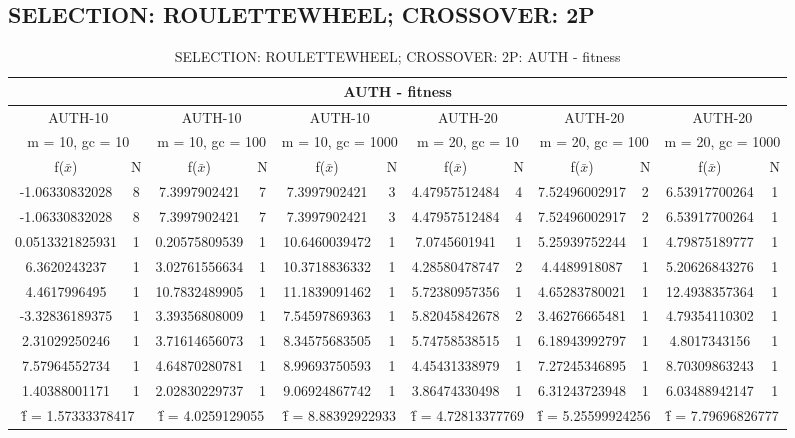 \subsection{SELECTION: ROULETTEWHEEL; CROSSOVER: 2P}
\begin{table}[H]
	\centering
	\caption{SELECTION: ROULETTEWHEEL; CROSSOVER: 2P: AUTH - fitness}
	\begin{adjustbox}{width=1\textwidth}
		\begin{tabular}{ |c|c||c|c||c|c||c|c||c|c||c|c| }
			\hline
			\multicolumn{12}{|c|}{AUTH - fitness} \\
			\hline
			\multicolumn{2}{|c||}{AUTH-10} & \multicolumn{2}{c||}{AUTH-10} & \multicolumn{2}{c||}{AUTH-10} & \multicolumn{2}{c||}{AUTH-20} & \multicolumn{2}{c||}{AUTH-20} & \multicolumn{2}{c|}{AUTH-20}\\
			\hline
			\multicolumn{2}{|c||}{m = 10, gc = 10} & \multicolumn{2}{c||}{m = 10, gc = 100} & \multicolumn{2}{c||}{m = 10, gc = 1000} & \multicolumn{2}{c||}{m = 20, gc = 10} & \multicolumn{2}{c||}{m = 20, gc = 100} & \multicolumn{2}{c|}{m = 20, gc = 1000}\\
			\hline
			f($\bar{x}$) & N & f($\bar{x}$) & N & f($\bar{x}$) & N & f($\bar{x}$) & N & f($\bar{x}$) & N & f($\bar{x}$) & N\\
			\hline
			\hline
			-1.06330832028 & 8 & 7.3997902421 & 7 & 7.3997902421 & 3 & 4.47957512484 & 4 & 7.52496002917 & 2 & 6.53917700264 & 1\\
			\hline
			-1.06330832028 & 8 & 7.3997902421 & 7 & 7.3997902421 & 3 & 4.47957512484 & 4 & 7.52496002917 & 2 & 6.53917700264 & 1\\
			0.0513321825931 & 1 & 0.20575809539 & 1 & 10.6460039472 & 1 & 7.0745601941 & 1 & 5.25939752244 & 1 & 4.79875189777 & 1\\
			6.3620243237 & 1 & 3.02761556634 & 1 & 10.3718836332 & 1 & 4.28580478747 & 2 & 4.4489918087 & 1 & 5.20626843276 & 1\\
			4.4617996495 & 1 & 10.7832489905 & 1 & 11.1839091462 & 1 & 5.72380957356 & 1 & 4.65283780021 & 1 & 12.4938357364 & 1\\
			-3.32836189375 & 1 & 3.39356808009 & 1 & 7.54597869363 & 1 & 5.82045842678 & 2 & 3.46276665481 & 1 & 4.79354110302 & 1\\
			2.31029250246 & 1 & 3.71614656073 & 1 & 8.34575683505 & 1 & 5.74758538515 & 1 & 6.18943992797 & 1 & 4.8017343156 & 1\\
			7.57964552734 & 1 & 4.64870280781 & 1 & 8.99693750593 & 1 & 4.45431338979 & 1 & 7.27245346895 & 1 & 8.70309863243 & 1\\
			1.40388001171 & 1 & 2.02830229737 & 1 & 9.06924867742 & 1 & 3.86474330498 & 1 & 6.31243723948 & 1 & 6.03488942147 & 1\\
			\hline
			\multicolumn{2}{|c||}{\^{f} = 1.57333378417} & \multicolumn{2}{c||}{\^{f} = 4.0259129055} & \multicolumn{2}{c||}{\^{f} = 8.88392922933} & \multicolumn{2}{c||}{\^{f} = 4.72813377769} & \multicolumn{2}{c||}{\^{f} = 5.25599924256} & \multicolumn{2}{c|}{\^{f} = 7.79696826777}\\
			\hline
		\end{tabular}
	\end{adjustbox}
\end{table}
